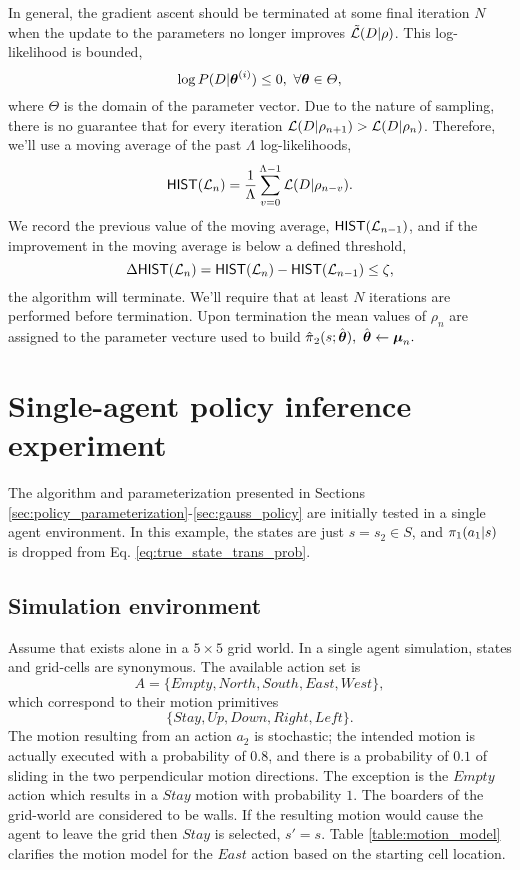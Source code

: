     In general, the gradient ascent should be terminated at some final iteration $N$ when the update to the parameters
    no longer improves
    $\tilde{\mathcal{L}}(D|\rho)$. This log-likelihood is bounded,
    \[
    \log P(D|\boldsymbol{\mathbb{\theta}}^{(i)}) \leq 0,\  \forall \boldsymbol{\mathbb{\theta}} \in \varTheta,
    \]
    where $\varTheta$ is the domain of the parameter vector. Due to the nature of sampling, there is no guarantee that
    for every iteration $\mathcal{L}(D|\rho_{n+1})> \mathcal{L}(D|\rho_n)$. Therefore, we'll use a moving average of the past
    $\Lambda$ log-likelihoods,
    \[
    \mathsf{HIST}(\mathcal{L}_n)=\frac{1}{\Lambda}\sum_{v=0}^{\Lambda-1}\mathcal{L}(D|\rho_{n-v}).
    \]
    We record the previous value of the moving average, $\mathsf{HIST}(\mathcal{L}_{n-1})$, and if the improvement in the
    moving average is below a defined threshold,
    \[
    \Delta\mathsf{HIST}(\mathcal{L}_n) = \mathsf{HIST}(\mathcal{L}_n) - \mathsf{HIST}(\mathcal{L}_{n-1}) \leq \zeta,
    \]
    the algorithm will terminate. We'll require that at least $N$ iterations are performed before termination. Upon
    termination the mean values of $\rho_{n}$ are assigned to the parameter vecture used to build
    $\estimate{\policy{}}_{2}(s;\estimate{\paramVec}),\ \estimate{\paramVec} \leftarrow \vect{\mu}_n.$

    \section{Single-agent policy inference experiment}\label{sec:single_agent_experiment}
    The algorithm and parameterization presented in Sections \ref{sec:policy_parameterization}-\ref{sec:gauss_policy}
    are initially tested in a single agent environment. In this example, the states are just $s=s_2 \in S$, and
    $\pi_{1}(a_1|s)$ is dropped from Eq. \ref{eq:true_state_trans_prob}.

    \subsection{Simulation environment}
    Assume that  exists alone in a $5\times5$ grid world. In a single agent simulation, states and grid-cells
    are synonymous. The available action set is
    \[
    A = \{Empty, North, South, East, West\},
    \]
    which correspond to their motion primitives
    \[
    \{Stay, Up, Down, Right, Left\}.
    \]
    The motion resulting from an action $a_2$ is stochastic; the intended motion is actually executed with a probability
    of $0.8$, and there is a probability of $0.1$ of sliding in the two perpendicular motion directions. The exception
    is the $Empty$ action which results in a $Stay$ motion with probability $1$. The boarders of the grid-world are
    considered to be walls. If the resulting motion would cause the agent to leave the grid then $Stay$ is selected,
    $s'=s$.  Table \ref{table:motion_model} clarifies the motion model for the $East$ action based on the starting cell
    location.

